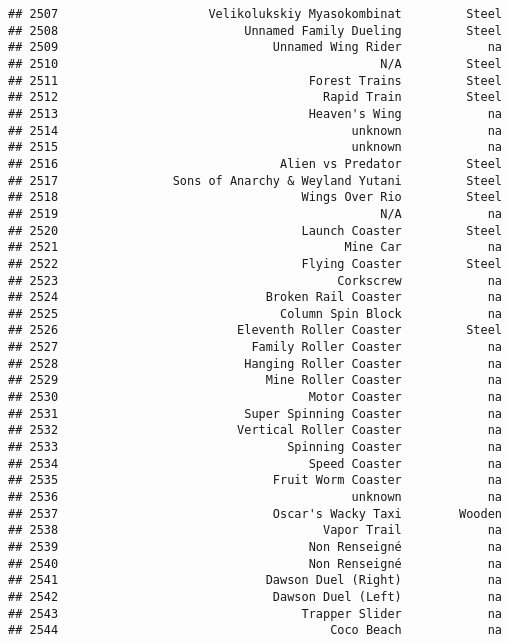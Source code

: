 \documentclass[
]{article}
\begin{document}
\begin{verbatim}
## 2507                     Velikolukskiy Myasokombinat         Steel
## 2508                          Unnamed Family Dueling         Steel
## 2509                              Unnamed Wing Rider            na
## 2510                                             N/A         Steel
## 2511                                   Forest Trains         Steel
## 2512                                     Rapid Train         Steel
## 2513                                   Heaven's Wing            na
## 2514                                         unknown            na
## 2515                                         unknown            na
## 2516                               Alien vs Predator         Steel
## 2517                Sons of Anarchy & Weyland Yutani         Steel
## 2518                                  Wings Over Rio         Steel
## 2519                                             N/A            na
## 2520                                  Launch Coaster         Steel
## 2521                                        Mine Car            na
## 2522                                  Flying Coaster         Steel
## 2523                                       Corkscrew            na
## 2524                             Broken Rail Coaster            na
## 2525                               Column Spin Block            na
## 2526                         Eleventh Roller Coaster         Steel
## 2527                           Family Roller Coaster            na
## 2528                          Hanging Roller Coaster            na
## 2529                             Mine Roller Coaster            na
## 2530                                   Motor Coaster            na
## 2531                          Super Spinning Coaster            na
## 2532                         Vertical Roller Coaster            na
## 2533                                Spinning Coaster            na
## 2534                                   Speed Coaster            na
## 2535                              Fruit Worm Coaster            na
## 2536                                         unknown            na
## 2537                              Oscar's Wacky Taxi        Wooden
## 2538                                     Vapor Trail            na
## 2539                                   Non Renseigné            na
## 2540                                   Non Renseigné            na
## 2541                             Dawson Duel (Right)            na
## 2542                              Dawson Duel (Left)            na
## 2543                                  Trapper Slider            na
## 2544                                      Coco Beach            na

\end{verbatim}
\end{document}
